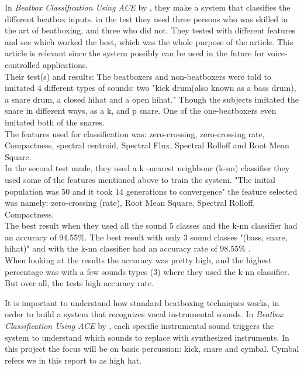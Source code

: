 In \textit{Beatbox Classification Using ACE} by \cite{Sinyor05}, they make a system that classifies the different beatbox inputs. in the test they used three persons who was skilled in the art of beatboxing, and three who did not.\cite{Sinyor05} They tested with different features and see which worked the best, which  was the whole purpose of the article. This article is relevant since the system possibly can be used in the future for voice-controlled applications.\\
Their test(s) and results:
The beatboxers and non-beatboxers were told to imitated 4 different types of sounds: two "kick drum(also known as a bass drum), a snare drum, a closed hihat and a open hihat."\cite{Sinyor05} Though the subjects imitated the snare in different ways, as a k, and p snare. One of the one-beatboxers even imitated both of the snares.\\
The features \cite{Sinyor05} used for classification was: zero-crossing, zero-crossing rate, Compactness, spectral centroid, Spectral Flux, Spectral Rolloff and Root Mean Square\cite{Sinyor05}.\\
In the second test \cite{Sinyor05} made, they used a k -nearest neighbour (k-nn) classifier they used some of the features mentioned above to train the system. "The initial population was 50 and it took 14 generations to convergence" \cite{Sinyor05} the feature selected was namely: zero-crossing (rate), Root Mean Square, Spectral Rolloff, Compactness.\\ 
The best result when they used all the sound 5 classes and the k-nn classifier had an accuracy of 94.55\%. The best result with only 3 sound classes "(bass, snare, hihat)" \cite{Sinyor05} and with the k-nn classifier had an accuracy rate of 98.55\% \cite{Sinyor05}.\\
When looking at the results the accuracy was pretty high, and the highest percentage was with a few sounds types (3)  where they used the k-nn classifier. But over all, the tests high accuracy rate.



It is important to understand how standard beatboxing techniques works, in order to build a system that recognizes vocal instrumental sounds.
In \textit{Beatbox Classification Using ACE} by \cite{Sinyor05}, each specific instrumental sound triggers the system to understand which sounds to replace with synthesized instruments. In this project the focus will be on basic percussion: kick, snare and cymbal. Cymbal refers we in this report to as high hat.

